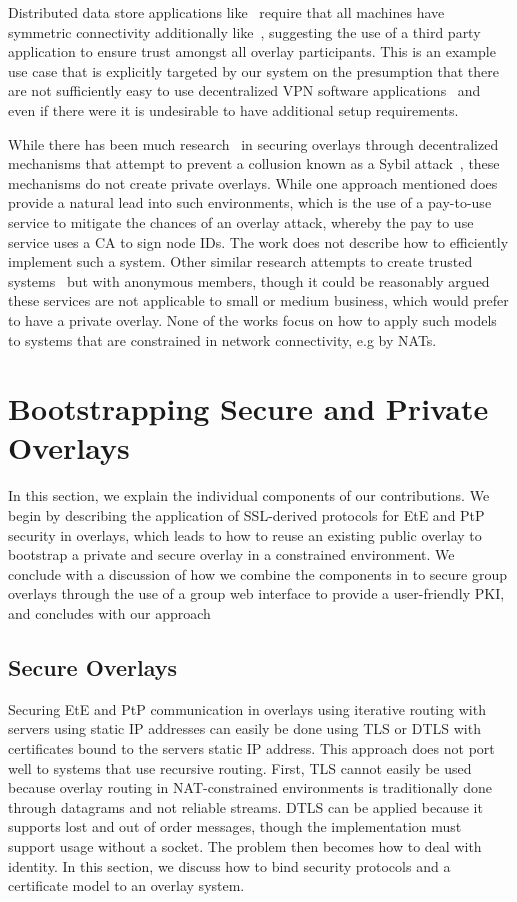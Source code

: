 \documentclass[conference]{IEEEtran}
\begin{document}
Distributed data store applications like~\cite{dynamo, bigtable} require that
all machines have symmetric connectivity additionally like~\cite{past}, suggesting
the use of a third party application to ensure trust amongst all overlay
participants.  This is an example use case that is explicitly targeted by our
system on the presumption that there are not sufficiently easy to use
decentralized VPN software applications~\cite{sc09, nsdi10} and even if there
were it is undesirable to have additional setup requirements.

While there has been much research~\cite{secure_routing} in securing overlays
through decentralized mechanisms that attempt to prevent a collusion known as
a Sybil attack~\cite{sybil}, these mechanisms do not create private overlays.
While one approach mentioned does provide a natural lead into such
environments, which is the use of a pay-to-use service to mitigate the chances
of an overlay attack, whereby the pay to use service uses a CA to sign node
IDs.  The work does not describe how to efficiently implement such a system.
Other similar research attempts to create trusted systems~\cite{stone, tor} but
with anonymous members, though it could be reasonably argued these services are
not applicable to small or medium business, which would prefer to have a private
overlay.  None of the works focus on how to apply such models to
systems that are constrained in network connectivity, e.g by NATs.

\section{Bootstrapping Secure and Private Overlays}
\label{contributions}
In this section, we explain the individual components of our contributions.  We
begin by describing the application of SSL-derived protocols for EtE and PtP security in
overlays, which leads to how to reuse an existing public overlay to bootstrap a
private and secure overlay in a constrained environment.  We conclude with a
discussion of how we combine the components in to secure group overlays through
the use of a group web interface to provide a user-friendly PKI, and concludes
with our approach 

\subsection{Secure Overlays}
\label{secure_overlays}
Securing EtE and PtP communication in overlays using iterative routing with
servers using static IP addresses can easily be done using TLS or DTLS with
certificates bound to the servers static IP address.  This approach does not
port well to systems that use recursive routing. First, TLS cannot easily be used
because overlay routing in NAT-constrained environments is traditionally done
through datagrams and not reliable streams.
DTLS can be applied because it supports lost and out of order messages, though
the implementation must support usage without a socket.  The
problem then becomes how to deal with identity.  In this section, we discuss how
to bind security protocols and a certificate model to an overlay system.
\end{document}
